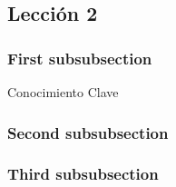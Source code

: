 \subsection{Lecci\'on 2}

\begin{opening}\blindtext\end{opening}
\subsubsection{First subsubsection}
\Blindtext
\begin{important}[0.45\textwidth]{Conocimiento Clave}
    \blindtext
\end{important}
\Blindtext
\subsubsection{Second subsubsection}
\Blindtext
\subsubsection{Third subsubsection}
\Blindtext
\begin{closing}
    \blindtext
\end{closing}

\begin{problemas}
    \Blindenumerate[2]
\end{problemas}